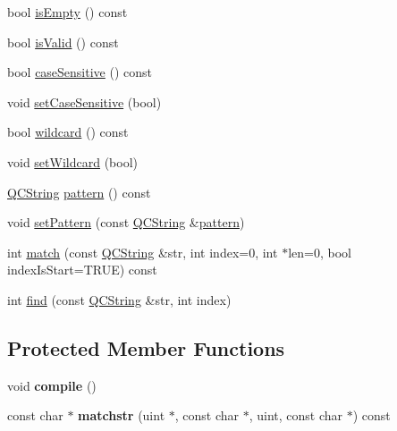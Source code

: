 \begin{DoxyCompactItemize}
\item 
bool \mbox{\hyperlink{class_q_reg_exp_a184d946c8dc57a15952b7ac21af2fbed}{is\+Empty}} () const
\item 
bool \mbox{\hyperlink{class_q_reg_exp_a2f616e8cd604271fafc5fbe8435e294c}{is\+Valid}} () const
\item 
bool \mbox{\hyperlink{class_q_reg_exp_ae1e5a7363426ebf095c2312ad5472a35}{case\+Sensitive}} () const
\item 
void \mbox{\hyperlink{class_q_reg_exp_a99dd9f410cfa14efda7990bac1fd089e}{set\+Case\+Sensitive}} (bool)
\item 
bool \mbox{\hyperlink{class_q_reg_exp_ab56c5356c514e92127cfea318fe47ba9}{wildcard}} () const
\item 
void \mbox{\hyperlink{class_q_reg_exp_a706203a025db3f506cced8e34faa8d4e}{set\+Wildcard}} (bool)
\item 
\mbox{\hyperlink{class_q_c_string}{Q\+C\+String}} \mbox{\hyperlink{class_q_reg_exp_ad2b7d2452926d97a5203ea1c1247a357}{pattern}} () const
\item 
void \mbox{\hyperlink{class_q_reg_exp_ad40709cbfe75f759293e00142367e7cb}{set\+Pattern}} (const \mbox{\hyperlink{class_q_c_string}{Q\+C\+String}} \&\mbox{\hyperlink{class_q_reg_exp_ad2b7d2452926d97a5203ea1c1247a357}{pattern}})
\item 
int \mbox{\hyperlink{class_q_reg_exp_a7eef4b63ebbda0a41251f2159f288ab9}{match}} (const \mbox{\hyperlink{class_q_c_string}{Q\+C\+String}} \&str, int index=0, int $\ast$len=0, bool index\+Is\+Start=T\+R\+UE) const
\item 
int \mbox{\hyperlink{class_q_reg_exp_af38e38dccf74a21a3c699cc203f19878}{find}} (const \mbox{\hyperlink{class_q_c_string}{Q\+C\+String}} \&str, int index)
\end{DoxyCompactItemize}
\subsection*{Protected Member Functions}
\begin{DoxyCompactItemize}
\item 
\mbox{\label{class_q_reg_exp_a84ff8f5f1c6e54a303dfcbe1e61b7fe2}} 
void {\bfseries compile} ()
\item 
\mbox{\label{class_q_reg_exp_a2f9463ebeeb3ad5cd94afd56bd75017f}} 
const char $\ast$ {\bfseries matchstr} (uint $\ast$, const char $\ast$, uint, const char $\ast$) const
\end{DoxyCompactItemize}


